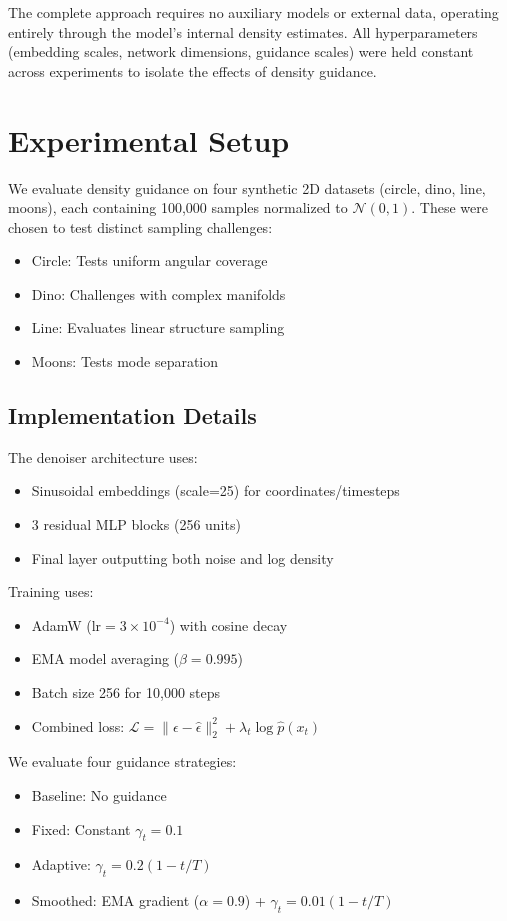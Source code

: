 \documentclass{article} %
\begin{document}
The complete approach requires no auxiliary models or external data, operating entirely through the model's internal density estimates. All hyperparameters (embedding scales, network dimensions, guidance scales) were held constant across experiments to isolate the effects of density guidance.

\section{Experimental Setup}
\label{sec:experimental}

We evaluate density guidance on four synthetic 2D datasets (circle, dino, line, moons), each containing 100,000 samples normalized to $\mathcal{N}(0,1)$. These were chosen to test distinct sampling challenges:
\begin{itemize}
    \item Circle: Tests uniform angular coverage
    \item Dino: Challenges with complex manifolds
    \item Line: Evaluates linear structure sampling
    \item Moons: Tests mode separation
\end{itemize}

\subsection{Implementation Details}
The denoiser architecture uses:
\begin{itemize}
    \item Sinusoidal embeddings (scale=25) for coordinates/timesteps
    \item 3 residual MLP blocks (256 units)
    \item Final layer outputting both noise and log density
\end{itemize}

Training uses:
\begin{itemize}
    \item AdamW ($\text{lr}=3\times10^{-4}$) with cosine decay
    \item EMA model averaging ($\beta=0.995$)
    \item Batch size 256 for 10,000 steps
    \item Combined loss: $\mathcal{L} = \|\epsilon-\hat{\epsilon}\|^2_2 + \lambda_t\log\hat{p}(x_t)$
\end{itemize}

We evaluate four guidance strategies:
\begin{itemize}
    \item Baseline: No guidance
    \item Fixed: Constant $\gamma_t=0.1$
    \item Adaptive: $\gamma_t=0.2(1-t/T)$
    \item Smoothed: EMA gradient ($\alpha=0.9$) + $\gamma_t=0.01(1-t/T)$
\end{itemize}
\end{document}
